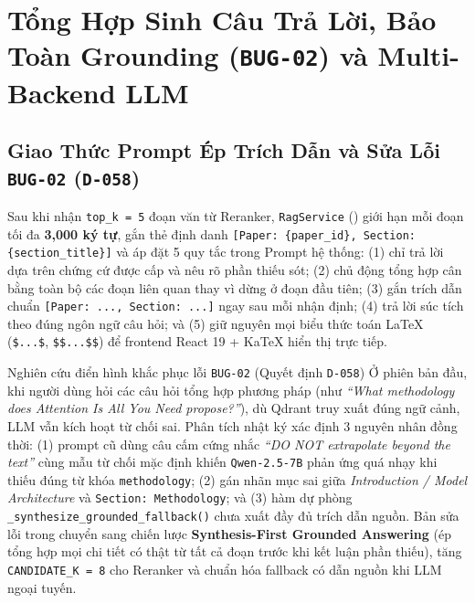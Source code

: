 \FloatBarrier
\section{\texorpdfstring{Tổng Hợp Sinh Câu Trả Lời, Bảo Toàn Grounding (\texttt{BUG-02}) và Multi-Backend LLM}{Tong Hop Sinh Cau Tra Loi, Bao Toan Grounding (BUG-02) va Multi-Backend LLM}}
\label{sec:ch4_llm_synthesis}

\subsection{\texorpdfstring{Giao Thức Prompt Ép Trích Dẫn và Sửa Lỗi \texttt{BUG-02} (\texttt{D-058})}{Giao Thuc Prompt Ep Trich Dan va Sua Loi BUG-02 (D-058)}}
\label{sec:ch4_prompt_bug02}

Sau khi nhận \texttt{top\_k = 5} đoạn văn từ Reranker, \texttt{RagService} () giới hạn mỗi đoạn tối đa \textbf{3,000 ký tự}, gắn thẻ định danh \texttt{[Paper: \{paper\_id\}, Section: \{section\_title\}]} và áp đặt 5 quy tắc trong Prompt hệ thống: (1) chỉ trả lời dựa trên chứng cứ được cấp và nêu rõ phần thiếu sót; (2) chủ động tổng hợp cân bằng toàn bộ các đoạn liên quan thay vì dừng ở đoạn đầu tiên; (3) gắn trích dẫn chuẩn \texttt{[Paper: ..., Section: ...]} ngay sau mỗi nhận định; (4) trả lời súc tích theo đúng ngôn ngữ câu hỏi; và (5) giữ nguyên mọi biểu thức toán LaTeX (\texttt{\$...\$}, \texttt{\$\$...\$\$}) để frontend React 19 + KaTeX hiển thị trực tiếp.

\begin{calloutbox}{Nghiên cứu điển hình khắc phục lỗi \texttt{BUG-02} (Quyết định \texttt{D-058})}
Ở phiên bản đầu, khi người dùng hỏi các câu hỏi tổng hợp phương pháp (như \textit{``What methodology does Attention Is All You Need propose?''}), dù Qdrant truy xuất đúng ngữ cảnh, LLM vẫn kích hoạt từ chối sai. Phân tích nhật ký xác định 3 nguyên nhân đồng thời: (1) prompt cũ dùng câu cấm cứng nhắc \textit{``DO NOT extrapolate beyond the text''} cùng mẫu từ chối mặc định khiến \texttt{Qwen-2.5-7B} phản ứng quá nhạy khi thiếu đúng từ khóa \texttt{methodology}; (2) gán nhãn mục sai giữa \textit{Introduction / Model Architecture} và \texttt{Section: Methodology}; và (3) hàm dự phòng \texttt{\_synthesize\_grounded\_fallback()} chưa xuất đầy đủ trích dẫn nguồn. Bản sửa lỗi trong  chuyển sang chiến lược \textbf{Synthesis-First Grounded Answering} (ép tổng hợp mọi chi tiết có thật từ tất cả đoạn trước khi kết luận phần thiếu), tăng \texttt{CANDIDATE\_K = 8} cho Reranker và chuẩn hóa fallback có dẫn nguồn khi LLM ngoại tuyến.
\end{calloutbox}

